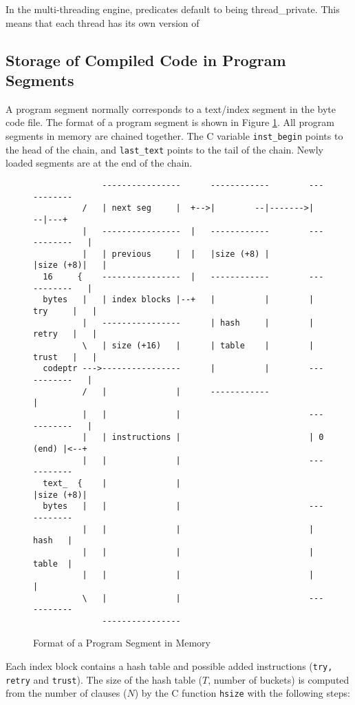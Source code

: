 \documentclass[11pt]{article}
\begin{document}
In the multi-threading engine, predicates default to being
thread\_private.  This means that each thread has its own version of 


\subsection{Storage of Compiled Code in Program Segments}

A program segment normally corresponds to a text/index segment in the 
byte code file.
The format of a program segment is shown in Figure \ref{f:programseg}.
All program segments in memory are chained together. The C variable
{\tt inst\_begin} points to the head of the chain, and 
{\tt last\_text} points to the tail of the chain. Newly loaded
segments are at the end of the chain.

\begin{figure}
\begin{verbatim}
              ----------------      ------------        -----------
          /   | next seg     |  +-->|        --|------->|       --|---+
          |   ----------------  |   ------------        -----------   |
          |   | previous     |  |   |size (+8) |        |size (+8)|   |
  16     {    ----------------  |   ------------        -----------   |
  bytes   |   | index blocks |--+   |          |        | try     |   |
          |   ----------------      | hash     |        | retry   |   |
          \   | size (+16)   |      | table    |        | trust   |   |
  codeptr --->----------------      |          |        -----------   |
          /   |              |      ------------                      |
          |   |              |                          -----------   |
          |   | instructions |                          | 0 (end) |<--+
          |   |              |                          -----------
  text_  {    |              |                          |size (+8)|
  bytes   |   |              |                          -----------
          |   |              |                          |  hash   |
          |   |              |                          |  table  |
          |   |              |                          |         |
          \   |              |                          -----------
              ----------------
\end{verbatim}
\caption{Format of a Program Segment in Memory}
\label{f:programseg}
\end{figure}

Each index block contains a hash table and possible added instructions
({\tt try, retry} and {\tt trust}). The size of the hash table
($T$, number of buckets) is computed from the number of clauses ($N$) by the C
function {\tt hsize} with the following steps:
\end{document}
